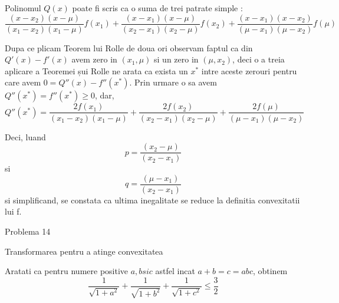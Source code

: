 \documentclass[a4paper,12pt,oneside]{report}
\begin{document}
Polinomul \(Q\left ( x \right )\) poate fi scris ca o suma de trei patrate simple : 
\begin{displaymath}
  \frac{\left ( x - x_{2} \right )\left ( x - \mu  \right )}{\left ( x_{1}  - x_{2}\right )\left ( x_{1} - \mu  \right )} f\left ( x_{1} \right ) + \frac{\left ( x - x_{1} \right )\left ( x - \mu  \right )}{\left ( x_{2}  - x_{1}\right )\left ( x_{2} - \mu  \right )}  f\left ( x_{2} \right ) +  \frac{\left ( x - x_{1} \right )\left ( x - x_{2}  \right )}{\left ( \mu   - x_{1}\right )\left (  \mu - x_{2} \right )}f\left ( \mu \right )
\end{displaymath}

Dupa ce plicam Teorem lui Rolle de doua ori observam faptul ca din \({Q}'\left ( x \right ) - {f}'\left ( x \right )\) avem zero in \(\left ( x_{1} , \mu \right )\) si un zero in \(\left ( \mu  , x_{2} \right )\), deci o a treia aplicare a Teoremei șui Rolle ne arata ca exista un \(x^{*}\) intre aceste zerouri pentru care avem \(0 = {Q}''\left ( x \right ) - {f}''\left ( x^{*} \right )\). Prin urmare o sa avem \({Q}''\left ( x^{*}  \right ) = {f}''\left ( x^{*} \right )\geq 0\), dar, 
\begin{displaymath}
  {Q}''\left ( x^{*}  \right ) = \frac{2f\left ( x_{1} \right )}{\left ( x_{1} - x_{2} \right )\left ( x_{1} - \mu  \right )} +  \frac{2f\left ( x_{2} \right )}{\left ( x_{2} - x_{1} \right )\left ( x_{2} - \mu  \right )} +  \frac{2f\left (\mu  \right )}{\left ( \mu  - x_{1} \right )\left ( \mu  - x_{2} \right )}
\end{displaymath}

Deci, luand  
\begin{displaymath}
  p = \frac{\left ( x_{2} - \mu  \right )}{\left ( x_{2} - x_{1}\right )}
\end{displaymath}
si 
\begin{displaymath}
  q = \frac{\left ( \mu  - x_{1} \right )}{\left ( x_{2} - x_{1} \right )}
\end{displaymath}
   si simplificand, se constata ca ultima inegalitate se reduce la definitia convexitatii lui f.

Problema 14

Transformarea pentru a atinge convexitatea 

Aratati ca pentru numere positive \(a , b si c\) astfel incat \(a + b = c = abc\), obtinem
\begin{displaymath}
  \frac{1}{\sqrt{1 + a^{2}}} + \frac{1}{\sqrt{1 + b^{2}}} + \frac{1}{\sqrt{1 + c^{2}}} \leq \frac{3}{2}
\end{displaymath}
\end{document}
